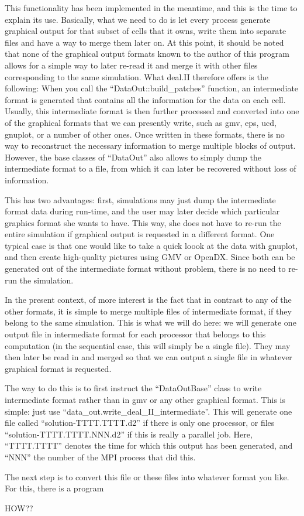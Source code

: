 \documentclass{article}
\begin{document}
This functionality has been implemented in the meantime, and this is the time
to explain its use. Basically, what we need to do is let every process
generate graphical output for that subset of cells that it owns, write them
into separate files and have a way to merge them later on. At this point, it
should be noted that none of the graphical output formats known to the author
of this program allows for a simple way to later re-read it and merge it with
other files corresponding to the same simulation. What deal.II therefore
offers is the following: When you call the ``DataOut::build\_patches''
function, an intermediate format is generated that contains all the
information for the data on each cell. Usually, this intermediate format is
then further processed and converted into one of the graphical formats that we
can presently write, such as gmv, eps, ucd, gnuplot, or a number of other
ones. Once written in these formats, there is no way to reconstruct the
necessary information to merge multiple blocks of output. However, the base
classes of ``DataOut'' also allows to simply dump the intermediate format to a
file, from which it can later be recovered without loss of information.

This has two advantages: first, simulations may just dump the intermediate
format data during run-time, and the user may later decide which particular
graphics format she wants to have. This way, she does not have to re-run the
entire simulation if graphical output is requested in a different format. One
typical case is that one would like to take a quick loook at the data with
gnuplot, and then create high-quality pictures using GMV or OpenDX. Since both
can be generated out of the intermediate format without problem, there is no
need to re-run the simulation.

In the present context, of more interest is the fact that in contrast to any
of the other formats, it is simple to merge multiple files of intermediate
format, if they belong to the same simulation. This is what we will do here:
we will generate one output file in intermediate format for each processor
that belongs to this computation (in the sequential case, this will simply be
a single file). They may then later be read in and merged so that we can
output a single file in whatever graphical format is requested.

The way to do this is to first instruct the ``DataOutBase'' class to
write intermediate format rather than in gmv or any other graphical
format. This is simple: just use
``data\_out.write\_deal\_II\_intermediate''. This will generate one file
called ``solution-TTTT.TTTT.d2'' if there is only one processor, or
files ``solution-TTTT.TTTT.NNN.d2'' if this is really a parallel
job. Here, ``TTTT.TTTT'' denotes the time for which this output has
been generated, and ``NNN'' the number of the MPI process that did this.

The next step is to convert this file or these files into whatever
format you like. For this, there is a program

HOW??
\end{document}

